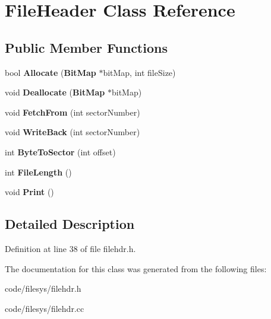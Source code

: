 \section{File\+Header Class Reference}
\label{class_file_header}
\subsection*{Public Member Functions}
\begin{DoxyCompactItemize}
\item 
bool {\bfseries Allocate} ({\bf Bit\+Map} $\ast$bit\+Map, int file\+Size)\label{class_file_header_a2fb90f63470e10c847393e124763fd1a}

\item 
void {\bfseries Deallocate} ({\bf Bit\+Map} $\ast$bit\+Map)\label{class_file_header_a0d8a66db0af2460ccb27edd8d2331179}

\item 
void {\bfseries Fetch\+From} (int sector\+Number)\label{class_file_header_aa85564cee98fc9592df08cc5e4a2efc6}

\item 
void {\bfseries Write\+Back} (int sector\+Number)\label{class_file_header_ab896cc7dd7274e3f8072da2c7d9beee8}

\item 
int {\bfseries Byte\+To\+Sector} (int offset)\label{class_file_header_adacbe1c1af441d0b1e978c65a05d60f2}

\item 
int {\bfseries File\+Length} ()\label{class_file_header_a676d88bbc37d3d108625be75d637a8e6}

\item 
void {\bfseries Print} ()\label{class_file_header_a57b661cda2c4d51ee06cc29e7ea0a0c0}

\end{DoxyCompactItemize}


\subsection{Detailed Description}


Definition at line 38 of file filehdr.\+h.



The documentation for this class was generated from the following files\+:\begin{DoxyCompactItemize}
\item 
code/filesys/filehdr.\+h\item 
code/filesys/filehdr.\+cc\end{DoxyCompactItemize}
